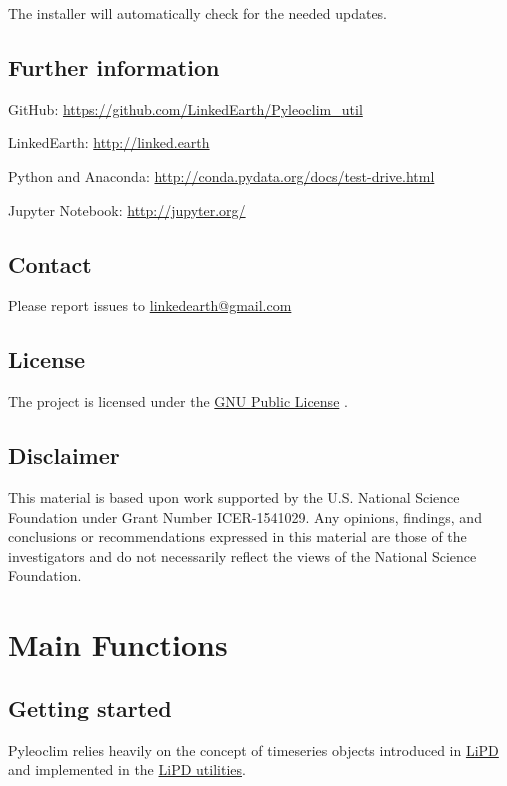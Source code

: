 \documentclass[letterpaper,10pt,english]{sphinxmanual}
\begin{document}
The installer will automatically check for the needed updates.


\section{Further information}
\label{Introduction:further-information}
\begin{DUlineblock}{0em}
\item[] GitHub: \href{https://github.com/LinkedEarth/Pyleoclim\_util}{https://github.com/LinkedEarth/Pyleoclim\_util}
\item[] LinkedEarth: \href{http://linked.earth}{http://linked.earth}
\item[] Python and Anaconda: \href{http://conda.pydata.org/docs/test-drive.html}{http://conda.pydata.org/docs/test-drive.html}
\item[] Jupyter Notebook: \href{http://jupyter.org/}{http://jupyter.org/}
\end{DUlineblock}


\section{Contact}
\label{Introduction:contact}
Please report issues to \href{mailto:linkedearth@gmail.com}{linkedearth@gmail.com}


\section{License}
\label{Introduction:license}
The project is licensed under the \href{https://github.com/LinkedEarth/Pyleoclim\_util/blob/master/license}{GNU Public License} .


\section{Disclaimer}
\label{Introduction:disclaimer}
This material is based upon work supported by the U.S. National Science Foundation under Grant Number
ICER-1541029. Any opinions, findings, and conclusions or recommendations expressed in this material are those
of the investigators and do not necessarily reflect the views of the National Science Foundation.


\chapter{Main Functions}
\label{Main:main-functions}\label{Main::doc}

\section{Getting started}
\label{Main:getting-started}
Pyleoclim relies heavily on the concept of timeseries objects introduced in
\href{http://www.clim-past.net/12/1093/2016/}{LiPD} and implemented in the
\href{http://nickmckay.github.io/LiPD-utilities/}{LiPD utilities}.
\end{document}

